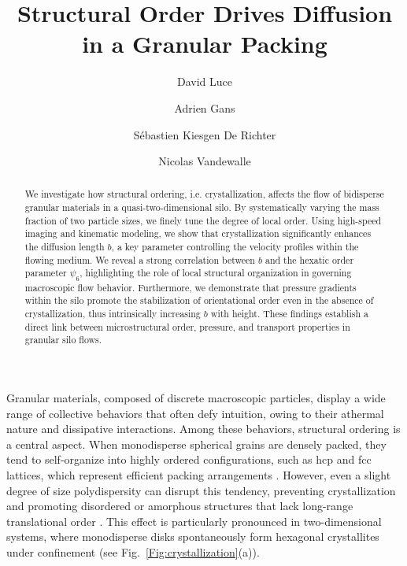\documentclass[twocolumn,aps,prl,superscriptaddress,showpacs,byrevtex]{revtex4-2}
\begin{document}
\title{Structural Order Drives Diffusion in a Granular Packing}

\author{David Luce}
\author{Adrien Gans}
\author{Sébastien Kiesgen De Richter}
\author{Nicolas Vandewalle}


\begin{abstract}
We investigate how structural ordering, i.e. crystallization, affects the flow of bidisperse granular materials in a quasi-two-dimensional silo. By systematically varying the mass fraction of two particle sizes, we finely tune the degree of local order. Using high-speed imaging and kinematic modeling, we show that crystallization significantly enhances the diffusion length $b$, a key parameter controlling the velocity profiles within the flowing medium. We reveal a strong correlation between $b$ and the hexatic order parameter $\psi_6$, highlighting the role of local structural organization in governing macroscopic flow behavior. Furthermore, we demonstrate that pressure gradients within the silo promote the stabilization of orientational order even in the absence of crystallization, thus intrinsically increasing $b$ with height. These findings establish a direct link between microstructural order, pressure, and transport properties in granular silo flows.
\end{abstract}

\maketitle

Granular materials, composed of discrete macroscopic particles, display a wide range of collective behaviors that often defy intuition, owing to their athermal nature and dissipative interactions. Among these behaviors, structural ordering is a central aspect. When monodisperse spherical grains are densely packed, they tend to self-organize into highly ordered configurations, such as hcp and fcc lattices, which represent efficient packing arrangements \cite{torquato2010jammed}. However, even a slight degree of size polydispersity can disrupt this tendency, preventing crystallization and promoting disordered or amorphous structures that lack long-range translational order \cite{watanabe2008direct, kondic2012topology}. This effect is particularly pronounced in two-dimensional systems, where monodisperse disks spontaneously form hexagonal crystallites under confinement (see Fig.~\ref{Fig:crystallization}(a)).
\end{document}
